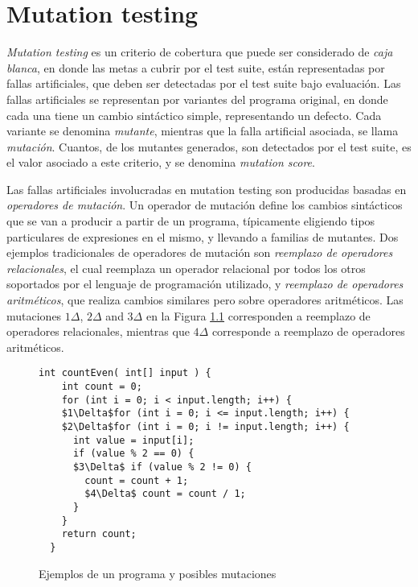 \chapter[Mutation]{Mutation testing}
\label{cap:preliminares.mutation}

\emph{Mutation testing} es un criterio de cobertura que puede ser considerado de \emph{caja blanca}, en donde las metas a cubrir por el test suite, est\'an representadas por fallas artificiales, que deben ser detectadas por el test suite bajo evaluaci\'on. Las fallas artificiales se representan por variantes del programa original, en donde cada una tiene un cambio sint\'actico simple, representando un defecto. Cada variante se denomina \emph{mutante}, mientras que la falla artificial asociada, se llama \emph{mutaci\'on}. Cuantos, de los mutantes generados, son detectados por el test suite, es el valor asociado a este criterio, y se denomina \emph{mutation score}.

Las fallas artificiales involucradas en mutation testing son producidas basadas en \emph{operadores de mutaci\'on}. Un operador de mutaci\'on define los cambios sint\'acticos que se van a producir a partir de un programa, t\'ipicamente eligiendo tipos particulares de expresiones en el mismo, y llevando a familias de mutantes. Dos ejemplos tradicionales de operadores de mutaci\'on son \emph{reemplazo de operadores relacionales}, el cual reemplaza un operador relacional por todos los otros soportados por el lenguaje de programaci\'on utilizado, y \emph{reemplazo de operadores aritm\'eticos}, que realiza cambios similares pero sobre operadores aritm\'eticos. Las mutaciones $1\Delta$, $2\Delta$ and $3\Delta$ en la Figura \ref{figures.examples.mutations} corresponden a reemplazo de operadores relacionales, mientras que $4\Delta$ corresponde a reemplazo de operadores aritm\'eticos.

\begin{figure}[t]
	\begin{lstlisting}[frame=tlrb, mathescape=true]
  int countEven( int[] input ) {
    int count = 0;
    for (int i = 0; i < input.length; i++) {
    $1\Delta$for (int i = 0; i <= input.length; i++) {
    $2\Delta$for (int i = 0; i != input.length; i++) {
      int value = input[i];
      if (value % 2 == 0) {
      $3\Delta$ if (value % 2 != 0) {
        count = count + 1;
        $4\Delta$ count = count / 1;
      }
    }
    return count;
  }
	\end{lstlisting}
	\caption{Ejemplos de un programa y posibles mutaciones}
	\label{figures.examples.mutations}
\end{figure}

